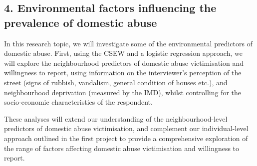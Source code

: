 \documentclass[11pt, a4paper]{article}
\begin{document}
\subsection*{4. Environmental factors influencing the prevalence of domestic abuse}

In this research topic, we will investigate some of the environmental predictors of domestic abuse. First, using the CSEW and a logistic regression approach, we will explore the neighbourhood predictors of domestic abuse victimisation and willingness to report, using information on the interviewer's perception of the street (signs of rubbish, vandalism, general condition of houses etc.), and neighbourhood deprivation (measured by the IMD), whilst controlling for the socio-economic characteristics of the respondent. 


These analyses will extend our understanding of the neighbourhood-level predictors of domestic abuse victimisation, and complement our individual-level approach outlined in the first project to provide a comprehensive exploration of the range of factors affecting domestic abuse victimisation and willingness to report.







%
%
%
%
%
\end{document}
